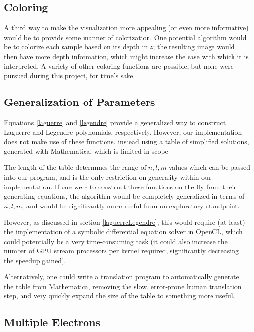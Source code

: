 \documentclass{acmsiggraph}
\begin{document}
\subsection{Coloring}

A third way to make the visualization more appealing (or even more informative) would be to provide some manner of colorization. One potential algorithm would be to colorize each sample based on its depth in $z$; the resulting image would then have more depth information, which might increase the ease with which it is interpreted. A variety of other coloring functions are possible, but none were pursued during this project, for time's sake.

\subsection{Generalization of Parameters}

Equations \ref{laguerre} and \ref{legendre} provide a generalized way to construct Laguerre and Legendre polynomials, respectively. However, our implementation does not make use of these functions, instead using a table of simplified solutions, generated with Mathematica, which is limited in scope.

The length of the table determines the range of $n, l, m$ values which can be passed into our program, and is the only restriction on generality within our implementation. If one were to construct these functions on the fly from their generating equations, the algorithm would be completely generalized in terms of $n, l, m$, and would be significantly more useful from an exploratory standpoint.

However, as discussed in section \ref{laguerreLegendre}, this would require (at least) the implementation of a symbolic differential equation solver in OpenCL, which could potentially be a very time-consuming task (it could also increase the number of GPU stream processors per kernel required, significantly decreasing the speedup gained).

Alternatively, one could write a translation program to automatically generate the table from Mathematica, removing the slow, error-prone human translation step, and very quickly expand the size of the table to something more useful.

\subsection{Multiple Electrons}
\end{document}
